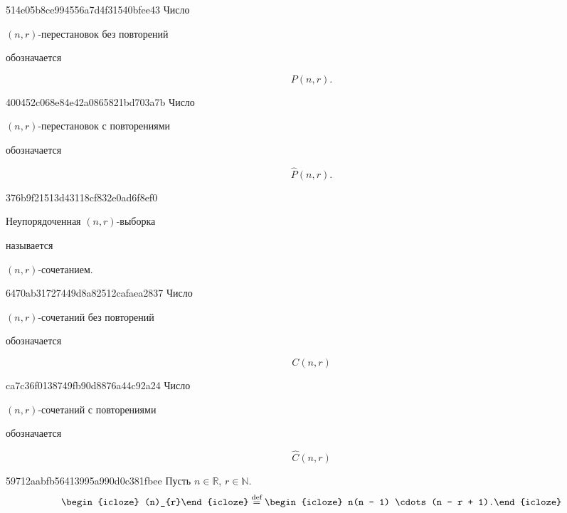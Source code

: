 \begin{note}{514e05b8ce994556a7d4f31540bfee43}
    Число \begin{icloze}{1}\({ (n, r) }\)-перестановок без повторений\end{icloze} обозначается \begin{icloze}{2}
        \[
            P(n, r).
        \]
    \end{icloze}
\end{note}

\begin{note}{400452c068e84e42a0865821bd703a7b}
    Число \begin{icloze}{2}\({ (n, r) }\)-перестановок с повторениями\end{icloze} обозначается \begin{icloze}{1}
        \[
            \widehat{P}(n, r).
        \]
    \end{icloze}
\end{note}

\begin{note}{376b9f21513d43118cf832e0ad6f8ef0}
    \begin{icloze}{2}Неупорядоченная \({ (n, r) }\)-выборка\end{icloze} называется \begin{icloze}{1}\({ (n, r) }\)-со\-че\-та\-ни\-ем.\end{icloze}
\end{note}

\begin{note}{6470ab31727449d8a82512cafaea2837}
    Число \begin{icloze}{2}\({ (n, r) }\)-сочетаний без повторений\end{icloze} обозначается \begin{icloze}{1}
        \[
            C(n, r)
        \]
    \end{icloze}
\end{note}

\begin{note}{ca7c36f0138749fb90d8876a44c92a24}
    Число \begin{icloze}{2}\({ (n, r) }\)-сочетаний с повторениями\end{icloze} обозначается \begin{icloze}{1}
        \[
            \widehat{C}(n, r)
        \]
    \end{icloze}
\end{note}

\begin{note}{59712aabfb56413995a990d0c381fbee}
    Пусть \({ n \in \mathbb R }\), \({ r \in \mathbb N }\).
    \[
        \begin{icloze}{2}(n)_{r}\end{icloze} \overset{\text{def}}= \begin{icloze}{1}n(n - 1) \cdots (n - r + 1).\end{icloze}
    \]
\end{note}

